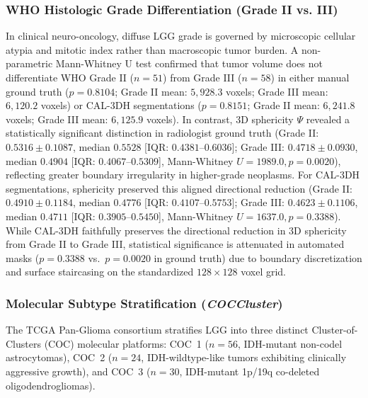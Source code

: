 \documentclass[11pt,a4paper]{article}
\begin{document}
\subsubsection{WHO Histologic Grade Differentiation (Grade II vs. III)}
In clinical neuro-oncology, diffuse LGG grade is governed by microscopic cellular atypia and mitotic index rather than macroscopic tumor burden. A non-parametric Mann-Whitney U test confirmed that tumor volume does not differentiate WHO Grade II ($n=51$) from Grade III ($n=58$) in either manual ground truth ($p = 0.8104$; Grade II mean: $5{,}928.3$ voxels; Grade III mean: $6{,}120.2$ voxels) or CAL-3DH segmentations ($p = 0.8151$; Grade II mean: $6{,}241.8$ voxels; Grade III mean: $6{,}125.9$ voxels). In contrast, 3D sphericity $\Psi$ revealed a statistically significant distinction in radiologist ground truth (Grade II: $0.5316 \pm 0.1087$, median $0.5528$ [IQR: $0.4381$--$0.6036$]; Grade III: $0.4718 \pm 0.0930$, median $0.4904$ [IQR: $0.4067$--$0.5309$], Mann-Whitney $U = 1989.0, p = 0.0020$), reflecting greater boundary irregularity in higher-grade neoplasms. For CAL-3DH segmentations, sphericity preserved this aligned directional reduction (Grade II: $0.4910 \pm 0.1184$, median $0.4776$ [IQR: $0.4107$--$0.5753$]; Grade III: $0.4623 \pm 0.1106$, median $0.4711$ [IQR: $0.3905$--$0.5450$], Mann-Whitney $U = 1637.0, p = 0.3388$). While CAL-3DH faithfully preserves the directional reduction in 3D sphericity from Grade II to Grade III, statistical significance is attenuated in automated masks ($p = 0.3388$ vs.\ $p = 0.0020$ in ground truth) due to boundary discretization and surface staircasing on the standardized $128 \times 128$ voxel grid.

\subsubsection{Molecular Subtype Stratification (\textit{COCCluster})}
The TCGA Pan-Glioma consortium stratifies LGG into three distinct Cluster-of-Clusters (COC) molecular platforms: COC~1 ($n=56$, IDH-mutant non-codel astrocytomas), COC~2 ($n=24$, IDH-wildtype-like tumors exhibiting clinically aggressive growth), and COC~3 ($n=30$, IDH-mutant 1p/19q co-deleted oligodendrogliomas).
\end{document}
